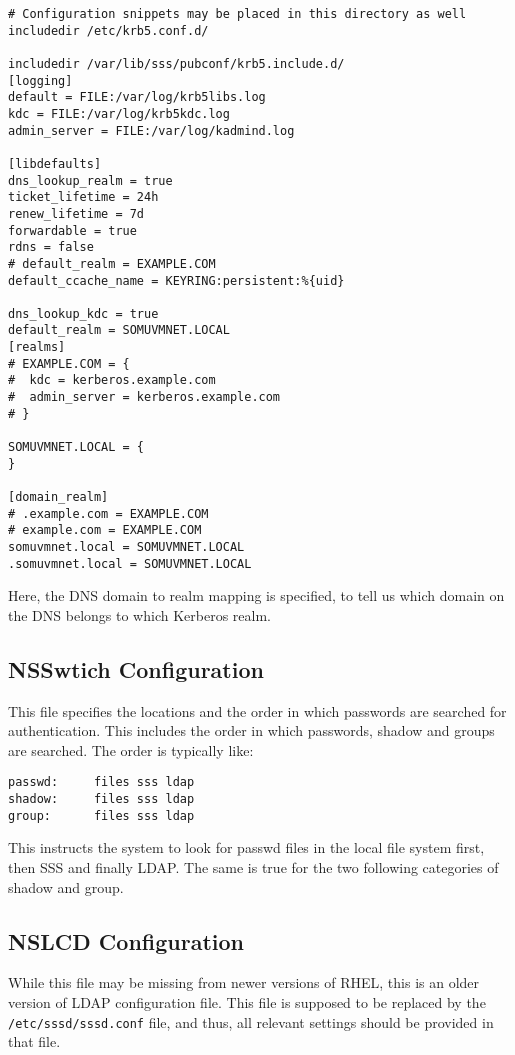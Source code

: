 \vspace{-15pt}
\begin{verbatim}
# Configuration snippets may be placed in this directory as well
includedir /etc/krb5.conf.d/

includedir /var/lib/sss/pubconf/krb5.include.d/
[logging]
default = FILE:/var/log/krb5libs.log
kdc = FILE:/var/log/krb5kdc.log
admin_server = FILE:/var/log/kadmind.log

[libdefaults]
dns_lookup_realm = true
ticket_lifetime = 24h
renew_lifetime = 7d
forwardable = true
rdns = false
# default_realm = EXAMPLE.COM
default_ccache_name = KEYRING:persistent:%{uid}

dns_lookup_kdc = true
default_realm = SOMUVMNET.LOCAL
[realms]
# EXAMPLE.COM = {
#  kdc = kerberos.example.com
#  admin_server = kerberos.example.com
# }

SOMUVMNET.LOCAL = {
}

[domain_realm]
# .example.com = EXAMPLE.COM
# example.com = EXAMPLE.COM
somuvmnet.local = SOMUVMNET.LOCAL
.somuvmnet.local = SOMUVMNET.LOCAL
\end{verbatim}
\vspace{-10pt}

\noindent
Here, the DNS domain to realm mapping is specified, to tell us which domain on the DNS belongs to which Kerberos realm. 

\subsection{NSSwtich Configuration}
This file specifies the locations and the order in which passwords are searched for authentication. This includes the order in which passwords, shadow and groups are searched. The order is typically like:

\vspace{-15pt}
\begin{verbatim}
passwd:     files sss ldap
shadow:     files sss ldap
group:      files sss ldap
\end{verbatim}
\vspace{-10pt}

\noindent
This instructs the system to look for passwd files in the local file system first, then SSS and finally LDAP. The same is true for the two following categories of shadow and group.

\subsection{NSLCD Configuration}
While this file may be missing from newer versions of RHEL, this is an older version of LDAP configuration file. This file is supposed to be replaced by the \verb|/etc/sssd/sssd.conf| file, and thus, all relevant settings should be provided in that file. 